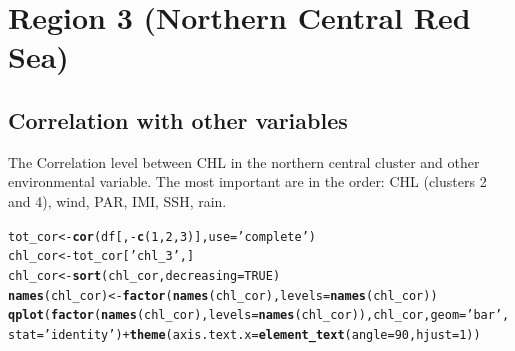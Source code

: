 \documentclass{article}\usepackage[]{graphicx}\usepackage[]{color}
\makeatletter
\newcommand{\hlnum}[1]{\textcolor[rgb]{0.686,0.059,0.569}{#1}}%
\newcommand{\hlstr}[1]{\textcolor[rgb]{0.192,0.494,0.8}{#1}}%
\newcommand{\hlopt}[1]{\textcolor[rgb]{0,0,0}{#1}}%
\newcommand{\hlstd}[1]{\textcolor[rgb]{0.345,0.345,0.345}{#1}}%
\newcommand{\hlkwb}[1]{\textcolor[rgb]{0.69,0.353,0.396}{#1}}%
\newcommand{\hlkwc}[1]{\textcolor[rgb]{0.333,0.667,0.333}{#1}}%
\newcommand{\hlkwd}[1]{\textcolor[rgb]{0.737,0.353,0.396}{\textbf{#1}}}%
\newenvironment{kframe}{%
 \def\at@end@of@kframe{}%
 \ifinner\ifhmode%
  \def\at@end@of@kframe{\end{minipage}}%
  \begin{minipage}{\columnwidth}%
 \fi\fi%
 \def\FrameCommand##1{\hskip\@totalleftmargin \hskip-\fboxsep
 \colorbox{shadecolor}{##1}\hskip-\fboxsep
     \hskip-\linewidth \hskip-\@totalleftmargin \hskip\columnwidth}%
 \MakeFramed {\advance\hsize-\width
   \@totalleftmargin\z@ \linewidth\hsize
   \@setminipage}}%
 {\par\unskip\endMakeFramed%
 \at@end@of@kframe}
\newenvironment{knitrout}{}{} %
\makeatother
\begin{document}
\section{Region 3 (Northern Central Red Sea)}

\subsection{Correlation with other variables}

The Correlation level between CHL in the northern central cluster
and other environmental variable.
The most important are in the order: CHL (clusters 2 and 4), wind, PAR,
IMI, SSH, rain.

\begin{knitrout}
\color{fgcolor}\begin{kframe}
\begin{alltt}
\hlstd{tot_cor} \hlkwb{<-} \hlkwd{cor}\hlstd{(df[,}\hlopt{-}\hlkwd{c}\hlstd{(}\hlnum{1}\hlstd{,}\hlnum{2}\hlstd{,}\hlnum{3}\hlstd{)],} \hlkwc{use}\hlstd{=}\hlstr{'complete'}\hlstd{)}
\hlstd{chl_cor} \hlkwb{<-} \hlstd{tot_cor[}\hlstr{'chl_3'}\hlstd{,]}
\hlstd{chl_cor} \hlkwb{<-} \hlkwd{sort}\hlstd{(chl_cor,} \hlkwc{decreasing}\hlstd{=}\hlnum{TRUE}\hlstd{)}
\hlkwd{names}\hlstd{(chl_cor)} \hlkwb{<-} \hlkwd{factor}\hlstd{(}\hlkwd{names}\hlstd{(chl_cor),} \hlkwc{levels}\hlstd{=}\hlkwd{names}\hlstd{(chl_cor))}
\hlkwd{qplot}\hlstd{(}\hlkwd{factor}\hlstd{(}\hlkwd{names}\hlstd{(chl_cor),} \hlkwc{levels}\hlstd{=}\hlkwd{names}\hlstd{(chl_cor)), chl_cor,} \hlkwc{geom}\hlstd{=}\hlstr{'bar'}\hlstd{,} \hlkwc{stat}\hlstd{=}\hlstr{'identity'}\hlstd{)} \hlopt{+} \hlkwd{theme}\hlstd{(}\hlkwc{axis.text.x} \hlstd{=} \hlkwd{element_text}\hlstd{(}\hlkwc{angle} \hlstd{=} \hlnum{90}\hlstd{,} \hlkwc{hjust} \hlstd{=} \hlnum{1}\hlstd{))}
\end{alltt}



\end{kframe}
\end{knitrout}
\end{document}
